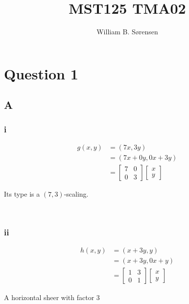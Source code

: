 \documentclass{article}
\author{William B. Sørensen}
\title{MST125 TMA02}
\newcommand{\blankpage}{
    \newpage
    \
    \newpage
}
\begin{document}
\maketitle
\tableofcontents

\newpage
\section{Question 1}
\subsection{A}
\subsubsection{i}

\begin{align*}
    g(x, y) &= (7x, 3y) \\
            &= (7x + 0y, 0x + 3y) \\
            &= \begin{bmatrix}
                7 & 0 \\
                0 & 3
               \end{bmatrix}
               \begin{bmatrix}
                   x\\ y
               \end{bmatrix}
\end{align*}

Its type is a $(7,3)$-scaling.

\blankpage
\subsubsection{ii}

\begin{align*}
    h(x, y) &= (x + 3y, y) \\
            &= (x + 3y, 0x + y) \\
            &= \begin{bmatrix}
                1 & 3 \\
                0 & 1
               \end{bmatrix}
               \begin{bmatrix}
                   x\\ y
               \end{bmatrix}
\end{align*}

A horizontal sheer with factor 3
\end{document}
